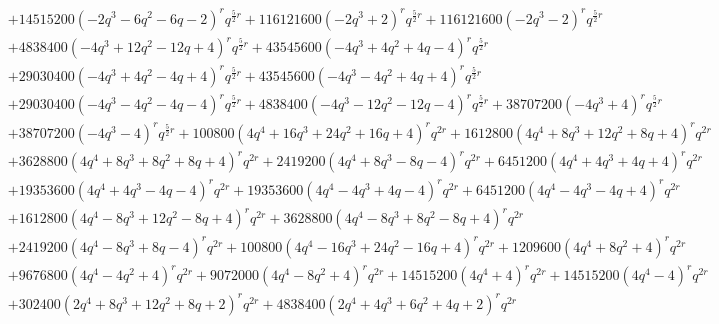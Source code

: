 \documentclass[11pt,english]{amsart}
\numberwithin{equation}{section}
\numberwithin{figure}{section}
\theoremstyle{plain}
\theoremstyle{plain}
\theoremstyle{definition}
\theoremstyle{remark}
\begin{document}
{\begin{align*}
& + 14515200  {\left(-2  q^{3} - 6  q^{2} - 6  q - 2\right)}^{r} q^{\frac{5}{2}  r} + 116121600  {\left(-2  q^{3} + 2\right)}^{r} q^{\frac{5}{2}  r} + 116121600  {\left(-2  q^{3} - 2\right)}^{r} q^{\frac{5}{2}  r} \\
& + 4838400  {\left(-4  q^{3} + 12  q^{2} - 12  q + 4\right)}^{r} q^{\frac{5}{2}  r} + 43545600  {\left(-4  q^{3} + 4  q^{2} + 4  q - 4\right)}^{r} q^{\frac{5}{2}  r} \\
& + 29030400  {\left(-4  q^{3} + 4  q^{2} - 4  q + 4\right)}^{r} q^{\frac{5}{2}  r} + 43545600  {\left(-4  q^{3} - 4  q^{2} + 4  q + 4\right)}^{r} q^{\frac{5}{2}  r} \\
& + 29030400  {\left(-4  q^{3} - 4  q^{2} - 4  q - 4\right)}^{r} q^{\frac{5}{2}  r} + 4838400  {\left(-4  q^{3} - 12  q^{2} - 12  q - 4\right)}^{r} q^{\frac{5}{2}  r} + 38707200  {\left(-4  q^{3} + 4\right)}^{r} q^{\frac{5}{2}  r} \\
& + 38707200  {\left(-4  q^{3} - 4\right)}^{r} q^{\frac{5}{2}  r} + 100800  {\left(4  q^{4} + 16  q^{3} + 24  q^{2} + 16  q + 4\right)}^{r} q^{2  r} + 1612800  {\left(4  q^{4} + 8  q^{3} + 12  q^{2} + 8  q + 4\right)}^{r} q^{2  r} \\
& + 3628800  {\left(4  q^{4} + 8  q^{3} + 8  q^{2} + 8  q + 4\right)}^{r} q^{2  r} + 2419200  {\left(4  q^{4} + 8  q^{3} - 8  q - 4\right)}^{r} q^{2  r} + 6451200  {\left(4  q^{4} + 4  q^{3} + 4  q + 4\right)}^{r} q^{2  r} \\
& + 19353600  {\left(4  q^{4} + 4  q^{3} - 4  q - 4\right)}^{r} q^{2  r} + 19353600  {\left(4  q^{4} - 4  q^{3} + 4  q - 4\right)}^{r} q^{2  r} + 6451200  {\left(4  q^{4} - 4  q^{3} - 4  q + 4\right)}^{r} q^{2  r} \\
& + 1612800  {\left(4  q^{4} - 8  q^{3} + 12  q^{2} - 8  q + 4\right)}^{r} q^{2  r} + 3628800  {\left(4  q^{4} - 8  q^{3} + 8  q^{2} - 8  q + 4\right)}^{r} q^{2  r} \\
& + 2419200  {\left(4  q^{4} - 8  q^{3} + 8  q - 4\right)}^{r} q^{2  r} + 100800  {\left(4  q^{4} - 16  q^{3} + 24  q^{2} - 16  q + 4\right)}^{r} q^{2  r} + 1209600  {\left(4  q^{4} + 8  q^{2} + 4\right)}^{r} q^{2  r} \\
& + 9676800  {\left(4  q^{4} - 4  q^{2} + 4\right)}^{r} q^{2  r} + 9072000  {\left(4  q^{4} - 8  q^{2} + 4\right)}^{r} q^{2  r} + 14515200  {\left(4  q^{4} + 4\right)}^{r} q^{2  r} + 14515200  {\left(4  q^{4} - 4\right)}^{r} q^{2  r} \\
& + 302400  {\left(2  q^{4} + 8  q^{3} + 12  q^{2} + 8  q + 2\right)}^{r} q^{2  r} + 4838400  {\left(2  q^{4} + 4  q^{3} + 6  q^{2} + 4  q + 2\right)}^{r} q^{2  r} \\

\end{align*}}
\end{document}
